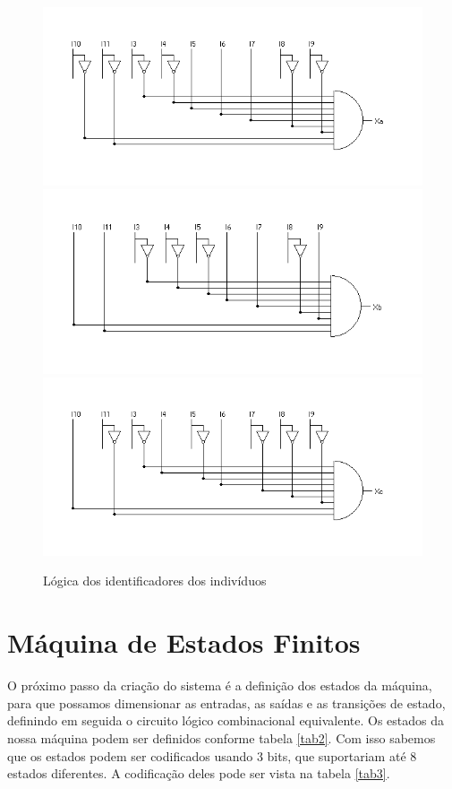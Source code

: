 \documentclass[12pt,a4paper]{article}
\begin{document}
\begin{figure}[!h]
\begin{center}
\includegraphics[width=.6\textwidth]{xa.png}
\includegraphics[width=.6\textwidth]{xb.png}
\includegraphics[width=.6\textwidth]{xc.png}
\end{center}
\caption{Lógica dos identificadores dos indivíduos}
\label{fig1}
\end{figure}

\newpage
\section{Máquina de Estados Finitos}

O próximo passo da criação do sistema é a definição dos estados da máquina, para que possamos dimensionar as entradas, as saídas e as transições de estado, definindo em seguida o circuito lógico combinacional equivalente. Os estados da nossa máquina podem ser definidos conforme tabela \ref{tab2}. Com isso sabemos que os estados podem ser codificados usando 3 bits, que suportariam até 8 estados diferentes. A codificação deles pode ser vista na tabela \ref{tab3}.
\end{document}
